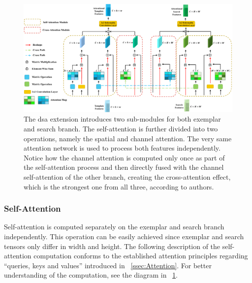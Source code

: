 \begin{figure}[t]
    \centerline{\includegraphics[width=\linewidth]{figures/siamese_tracking/deformable_siamese_attention.pdf}}
    \caption[\Gls{dsa} diagram]{The \gls{dsa} extension introduces two sub-modules for both exemplar and search branch. The self-attention is further divided into two operations, namely the spatial and channel attention. The very same attention network is used to process both features independently. Notice how the channel attention is computed only once as part of the self-attention process and then directly fused with the channel self-attention of the other branch, creating the cross-attention effect, which is the strongest one from all three, according to authors. }
    \label{fig:DeformableSiameseAttention}
\end{figure}

\subsubsection{Self-Attention}

Self-attention is computed separately on the exemplar and search branch independently. This operation can be easily achieved since exemplar and search tensors only differ in width and height. The following description of the self-attention computation conforms to the established attention principles regarding ``queries, keys and values'' introduced in \sectiontext{}~\ref{ssec:Attention}. For better understanding of the computation, see the diagram in \figtext{}~\ref{fig:DeformableSiameseAttention}.

